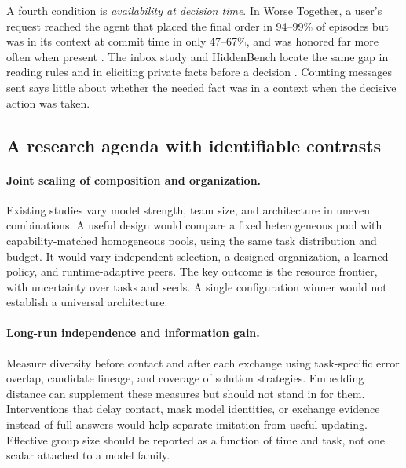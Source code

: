 A fourth condition is \emph{availability at decision time}. In Worse Together, a user's request reached the agent that placed the final order in 94--99\% of episodes but was in its context at commit time in only 47--67\%, and was honored far more often when present \citep{worse-together-blog}. The inbox study and HiddenBench locate the same gap in reading rules and in eliciting private facts before a decision \citep{inbox-coordination-primitive,hiddenbench}. Counting messages sent says little about whether the needed fact was in a context when the decisive action was taken.

\subsection{A research agenda with identifiable contrasts}
\paragraph{Joint scaling of composition and organization.}
Existing studies vary model strength, team size, and architecture in uneven combinations. A useful design would compare a fixed heterogeneous pool with capability-matched homogeneous pools, using the same task distribution and budget. It would vary independent selection, a designed organization, a learned policy, and runtime-adaptive peers. The key outcome is the resource frontier, with uncertainty over tasks and seeds. A single configuration winner would not establish a universal architecture.

\paragraph{Long-run independence and information gain.}
Measure diversity before contact and after each exchange using task-specific error overlap, candidate lineage, and coverage of solution strategies. Embedding distance can supplement these measures but should not stand in for them. Interventions that delay contact, mask model identities, or exchange evidence instead of full answers would help separate imitation from useful updating. Effective group size should be reported as a function of time and task, not one scalar attached to a model family.

